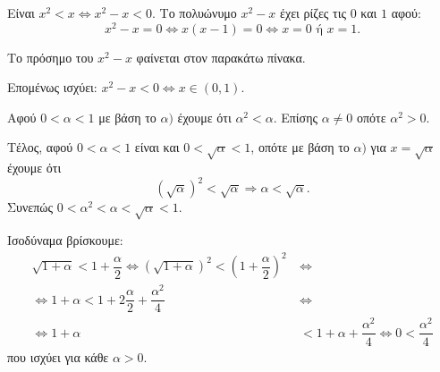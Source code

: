 
\begin{alist}
\item Είναι $x^2 < x \Leftrightarrow x^2 - x < 0$.
Το πολυώνυμο $x^2 - x$ έχει ρίζες τις $0$ και $1$ αφού:
\[x^2 - x = 0 \Leftrightarrow x(x - 1) = 0 \Leftrightarrow x = 0 \text{ ή } x = 1.\]

Το πρόσημο του $x^2 - x$ φαίνεται στον παρακάτω πίνακα.

\begin{center}
\end{center}

Επομένως ισχύει: $x^2 - x < 0 \Leftrightarrow x \in (0, 1)$.

\item
\begin{rlist}
\item Αφού $0 < \alpha < 1$ με βάση το $\alpha)$ έχουμε ότι $\alpha^2 < \alpha$.
Επίσης $\alpha \ne 0$ οπότε $\alpha^2 > 0$.

Τέλος, αφού $0 < \alpha < 1$ είναι και $0 < \sqrt{\alpha} < 1$, οπότε με βάση το $\alpha)$ για $x = \sqrt{\alpha}$ έχουμε ότι
\[(\sqrt{\alpha})^2 < \sqrt{\alpha} \Rightarrow \alpha < \sqrt{\alpha}.\]
Συνεπώς $0 < \alpha^2 < \alpha < \sqrt{\alpha} < 1$.

\item Ισοδύναμα βρίσκουμε:
\begin{align*}
\sqrt{1 + \alpha} < 1 + \dfrac{\alpha}{2} \Leftrightarrow (\sqrt{1 + \alpha})^2 < \left(1 + \dfrac{\alpha}{2}\right)^2 \ &\Leftrightarrow \\
\Leftrightarrow 1 + \alpha < 1 + 2\dfrac{\alpha}{2} + \dfrac{\alpha^2}{4} \ &\Leftrightarrow \\
\Leftrightarrow 1 + \alpha &< 1 + \alpha + \dfrac{\alpha^2}{4} \Leftrightarrow 0 < \dfrac{\alpha^2}{4}
\end{align*}
που ισχύει για κάθε $\alpha > 0$.
\end{rlist}
\end{alist}

